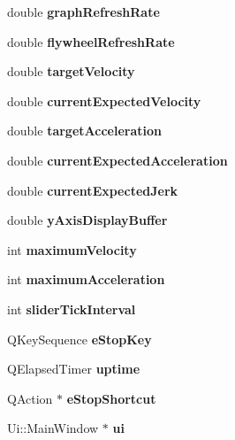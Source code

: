 \begin{DoxyCompactItemize}
double {\bfseries graph\+Refresh\+Rate}
\item 
\hypertarget{class_main_window_ad450b124c5daea75470bb6550081011e}{}\label{class_main_window_ad450b124c5daea75470bb6550081011e} 
double {\bfseries flywheel\+Refresh\+Rate}
\item 
\hypertarget{class_main_window_a468f6a2dee29d0488aa82f7e2583b5ae}{}\label{class_main_window_a468f6a2dee29d0488aa82f7e2583b5ae} 
double {\bfseries target\+Velocity}
\item 
\hypertarget{class_main_window_a879db4d65600c3b3945d67976d9a8622}{}\label{class_main_window_a879db4d65600c3b3945d67976d9a8622} 
double {\bfseries current\+Expected\+Velocity}
\item 
\hypertarget{class_main_window_a585bfd03f54d4e1f15109de662806090}{}\label{class_main_window_a585bfd03f54d4e1f15109de662806090} 
double {\bfseries target\+Acceleration}
\item 
\hypertarget{class_main_window_a6382bf386001d617cd5b717a92c5004d}{}\label{class_main_window_a6382bf386001d617cd5b717a92c5004d} 
double {\bfseries current\+Expected\+Acceleration}
\item 
\hypertarget{class_main_window_a380cbb9e901211a3c8fc685cea11c8f9}{}\label{class_main_window_a380cbb9e901211a3c8fc685cea11c8f9} 
double {\bfseries current\+Expected\+Jerk}
\item 
\hypertarget{class_main_window_a1f9fdf363545300d34f5aee2dddb1ff5}{}\label{class_main_window_a1f9fdf363545300d34f5aee2dddb1ff5} 
double {\bfseries y\+Axis\+Display\+Buffer}
\item 
\hypertarget{class_main_window_a14e66dcaf2393eed660d558651b07e94}{}\label{class_main_window_a14e66dcaf2393eed660d558651b07e94} 
int {\bfseries maximum\+Velocity}
\item 
\hypertarget{class_main_window_a6b3e09f92d0e995e5c349d6658121364}{}\label{class_main_window_a6b3e09f92d0e995e5c349d6658121364} 
int {\bfseries maximum\+Acceleration}
\item 
\hypertarget{class_main_window_a304d68be05ae4cd7086236120933ebcd}{}\label{class_main_window_a304d68be05ae4cd7086236120933ebcd} 
int {\bfseries slider\+Tick\+Interval}
\item 
\hypertarget{class_main_window_ad869af059f93289fa358e55d881d20a0}{}\label{class_main_window_ad869af059f93289fa358e55d881d20a0} 
Q\+Key\+Sequence {\bfseries e\+Stop\+Key}
\item 
\hypertarget{class_main_window_af999866626ad70973845e180fe7666f8}{}\label{class_main_window_af999866626ad70973845e180fe7666f8} 
Q\+Elapsed\+Timer {\bfseries uptime}
\item 
\hypertarget{class_main_window_a0efaeedddca035b6a26ebf229b4ce6ae}{}\label{class_main_window_a0efaeedddca035b6a26ebf229b4ce6ae} 
Q\+Action $\ast$ {\bfseries e\+Stop\+Shortcut}
\item 
\hypertarget{class_main_window_a35466a70ed47252a0191168126a352a5}{}\label{class_main_window_a35466a70ed47252a0191168126a352a5} 
Ui\+::\+Main\+Window $\ast$ {\bfseries ui}
\end{DoxyCompactItemize}


